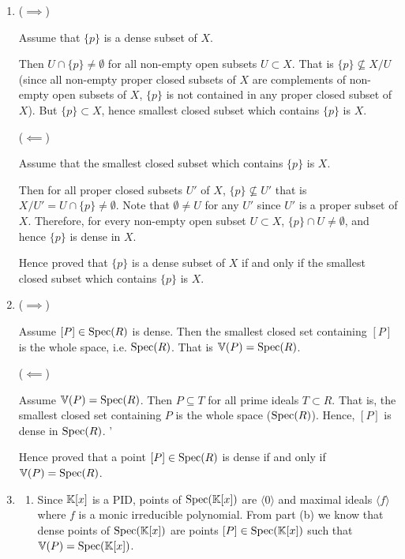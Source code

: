 \documentclass[Notebook.tex]{subfiles}
\begin{document}
\begin{solution}
    \bbni 
    \begin{enumerate}[label=(\alph*),ref=\theenumi\alph*]
        \item ($\implies$) 
        
        Assume that $\{p\}$ is a dense subset of $X$. 

        Then $U \cap \{p\} \neq \emptyset$ for all non-empty open subsets $U \subset X$. That is $\{p\} \not \subseteq X / U$ (since all non-empty proper closed subsets of $X$ are complements of non-empty open subsets of $X$, $\{p\}$ is not contained in any proper closed subset of $X$). But $\{p\} \subset X$, hence smallest closed subset which contains $\{p\}$ is $X$. 


        ($\impliedby$)

        Assume that the smallest closed subset which contains $\{p\}$ is $X$.  

        Then for all proper closed subsets $U'$ of $X$, $\{p\} \not \subseteq U'$ that is $X/U' = U \cap \{p\} \neq \emptyset$. Note that $\emptyset \neq U$ for any $U'$ since $U'$ is a proper subset of $X$. Therefore, for every non-empty open subset $U \subset X$, $\{p\} \cap U \neq \emptyset$, and hence $\{p\}$ is dense in $X$. 

       Hence proved that  $\{p\}$ is a dense subset of $X$ if and only if the smallest closed subset which contains $\{p\}$ is $X$. 

        \item ($\implies$) 
        
        Assume $[P] \in \operatorname{Spec}(R)$ is dense. Then the smallest closed set containing $[P]$ is the whole space, i.e. $\operatorname{Spec}(R)$. That is $\mathbb V(P) = \operatorname{Spec}(R)$. 

        ($\impliedby$)

        Assume $\mathbb V(P) = \operatorname{Spec}(R)$. 
        Then $P \subseteq T$ for all prime ideals $T \subset R$. That is, the smallest closed set containing $P$ is the whole space ($\operatorname{Spec}(R)$). Hence, $[P]$ is dense in $\operatorname{Spec}(R)$. '

        Hence proved that a point $[P] \in \operatorname{Spec}(R)$ is dense if and only if $\mathbb V(P) = \operatorname{Spec}(R)$.

        \item 
        
        \begin{enumerate}[label=(\roman*), ref=\theenumi\roman*]
            \item Since $\mathbb K[x]$ is a PID, points of $\operatorname{Spec}(\mathbb K[x])$ are $\langle 0 \rangle$ and maximal ideals $\langle f \rangle$ where $f$ is a monic irreducible polynomial. From part (b) we know that dense points of $\operatorname{Spec}(\mathbb K[x])$ are points $[P] \in \operatorname{Spec}(\mathbb K[x])$ such that $\mathbb V(P) = \operatorname{Spec}(\mathbb K[x])$. 
            

\end{enumerate}
\end{enumerate}
\end{solution}
\end{document}
